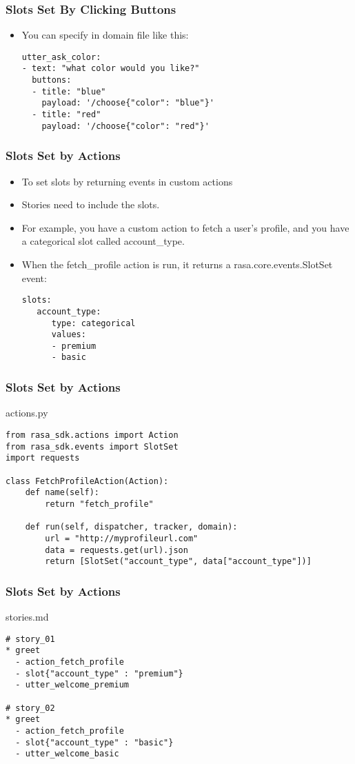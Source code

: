  \begin{frame}[fragile]\frametitle{Slots Set By Clicking Buttons}
\begin{itemize}
\item You can specify in domain file like this: 
\begin{lstlisting}
utter_ask_color:
- text: "what color would you like?"
  buttons:
  - title: "blue"
    payload: '/choose{"color": "blue"}'
  - title: "red"
    payload: '/choose{"color": "red"}'
\end{lstlisting}
\end{itemize}
\end{frame}

 \begin{frame}[fragile]\frametitle{Slots Set by Actions}
\begin{itemize}
\item To set slots by returning events in custom actions
\item Stories need to include the slots. 
\item For example, you have a custom action to fetch a user’s profile, and you have a categorical slot called account\_type. 
\item When the fetch\_profile action is run, it returns a rasa.core.events.SlotSet event:
\begin{lstlisting}
slots:
   account_type:
      type: categorical
      values:
      - premium
      - basic
\end{lstlisting}
\end{itemize}
\end{frame}

 \begin{frame}[fragile]\frametitle{Slots Set by Actions}
 actions.py
\begin{lstlisting}
from rasa_sdk.actions import Action
from rasa_sdk.events import SlotSet
import requests

class FetchProfileAction(Action):
    def name(self):
        return "fetch_profile"

    def run(self, dispatcher, tracker, domain):
        url = "http://myprofileurl.com"
        data = requests.get(url).json
        return [SlotSet("account_type", data["account_type"])]
\end{lstlisting}
\end{frame}

 \begin{frame}[fragile]\frametitle{Slots Set by Actions}
stories.md
\begin{lstlisting}
# story_01
* greet
  - action_fetch_profile
  - slot{"account_type" : "premium"}
  - utter_welcome_premium

# story_02
* greet
  - action_fetch_profile
  - slot{"account_type" : "basic"}
  - utter_welcome_basic
\end{lstlisting}
\end{frame}